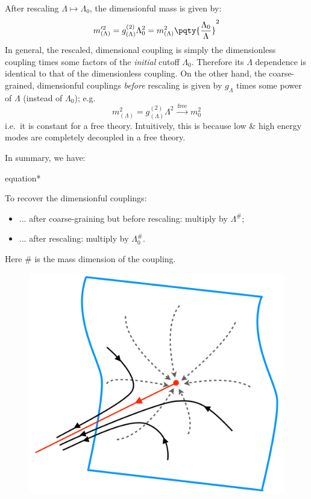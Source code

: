 \documentclass[a4paper
	,10pt
]{article}
\begin{document}
	After rescaling $\Lambda \mapsto \Lambda_0$, the dimensionful mass is given by:
	\begin{equation}
		m'^2_{(\Lambda)}
		= g^{(2)}_{(\Lambda)} \Lambda_0^2
		= m^2_{(\Lambda)}
			\pqty{\frac{\Lambda_0}{\Lambda}}^2
	\end{equation}
	In general, the rescaled, dimensional coupling is simply the dimensionless coupling times some factors of the \textit{initial} cutoff $\Lambda_0$. Therefore its $\Lambda$ dependence is identical to that of the dimensionless coupling. On the other hand, the coarse-grained, dimensionful couplings \textit{before} rescaling is given by $g_{\Lambda}$ times some power of $\Lambda$ (instead of $\Lambda_0$); e.g.
	\begin{equation}
		m^2_{(\Lambda)}
		= g^{(2)}_{(\Lambda)} \Lambda^2
		\xrightarrow{\ \text{free}\ }
		m_0^2
	\end{equation}
	i.e.\ it is constant for a free theory. Intuitively, this is because low \& high energy modes are completely decoupled in a free theory.
	
	In summary, we have:
	\begin{empheq}{equation*}
	\end{empheq}
	To recover the dimensionful couplings:
	\begin{itemize}[noitemsep]
	\item ... after coarse-graining but before rescaling: multiply by $\Lambda^\#$;
	\item ... after rescaling: multiply by $\Lambda_0^\#$.
	\end{itemize}
	Here $\#$ is the mass dimension of the coupling. 
	
	\begin{figure}[!h]
	\centering
	\includegraphics[width=.45\linewidth]{img/RG-flow.png}
	\end{figure}
	
\end{document}
